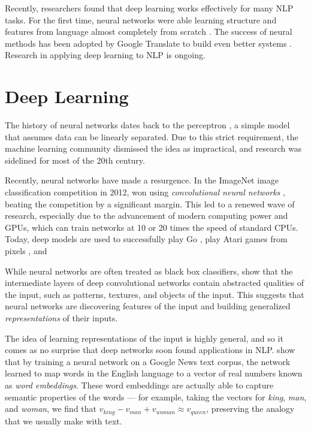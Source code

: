 \documentclass[11pt]{report}
\begin{document}
Recently, researchers found that deep learning works effectively for many NLP tasks. For the first time, neural networks were able learning structure and features from language almost completely from scratch \citep{Collobert2011}. %
The success of neural methods has been adopted by Google Translate to build even better systems \citep{GoogleTranslate2016}. Research in applying deep learning to NLP is ongoing.

\section{Deep Learning}

The history of neural networks dates back to the perceptron \citep{Rosenblatt1958}, a simple model that assumes data can be linearly separated. Due to this strict requirement, the machine learning community dismissed the idea as impractical, and research was sidelined for most of the 20th century.


Recently, neural networks have made a resurgence. In the ImageNet image classification competition in 2012, \citet{Krizhevsky2012} won using \emph{convolutional neural networks} \citep{LeCun1995}, beating the competition by a significant margin. This led to a renewed wave of research, especially due to the advancement of modern computing power and GPUs, which can train networks at 10 or 20 times the speed of standard CPUs. Today, deep models are used to successfully play Go \citep{Silver2016}, play Atari games from pixels \citep{deepatari2015}, and %


While neural networks are often treated as black box classifiers, \citet{Zeiler2014} show that the intermediate layers of deep convolutional networks contain abstracted qualities of the input, such as patterns, textures, and objects of the input. This suggests that neural networks are discovering features of the input and building generalized \emph{representations} of their inputs.


The idea of learning representations of the input is highly general, and so it comes as no surprise that deep networks soon found applications in NLP. \citet{mikolov2013word2vec} show that by training a neural network on a Google News text corpus, the network learned to map words in the English language to a vector of real numbers known as \emph{word embeddings}. These word embeddings are actually able to capture semantic properties of the words --- for example, taking the vectors for \emph{king}, \emph{man}, and \emph{woman}, we find that $v_{king} - v_{man} + v_{woman} \approx v_{queen}$, preserving the analogy that we usually make with text.
\end{document}
